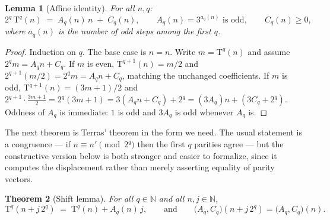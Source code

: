 \documentclass[11pt,a4paper]{article}
\theoremstyle{plain}
\newtheorem{theorem}{Theorem}[section]
\newtheorem{lemma}[theorem]{Lemma}
\theoremstyle{definition}
\newcommand{\N}{\mathbb{N}}
\newcommand{\Tmap}{\mathrm{T}}
\newcommand{\Acoef}{A}
\newcommand{\Ccoef}{C}
\begin{document}
\begin{lemma}[Affine identity]\label{lem:affine}
For all $n, q$:
\[
  2^{q}\,\Tmap^{q}(n) \;=\; \Acoef_{q}(n)\, n \;+\; \Ccoef_{q}(n),
  \qquad \Acoef_{q}(n) = 3^{a_{q}(n)} \text{ is odd},
  \qquad \Ccoef_{q}(n) \geq 0,
\]
where $a_{q}(n)$ is the number of odd steps among the first $q$.
\end{lemma}

\begin{proof}
Induction on $q$. The base case is $n = n$. Write $m = \Tmap^{q}(n)$ and assume
$2^{q}m = \Acoef_{q}n + \Ccoef_{q}$.
If $m$ is even, $\Tmap^{q+1}(n) = m/2$ and
$2^{q+1}(m/2) = 2^{q}m = \Acoef_{q}n + \Ccoef_{q}$, matching the unchanged
coefficients.
If $m$ is odd, $\Tmap^{q+1}(n) = (3m+1)/2$ and
$2^{q+1}\cdot\frac{3m+1}{2} = 2^{q}(3m+1) = 3(\Acoef_{q}n + \Ccoef_{q}) + 2^{q}
= (3\Acoef_{q})n + (3\Ccoef_{q} + 2^{q})$.
Oddness of $\Acoef_{q}$ is immediate: $1$ is odd and $3\Acoef_{q}$ is odd
whenever $\Acoef_{q}$ is.
\end{proof}

The next theorem is Terras' theorem in the form we need. The usual statement
is a congruence --- if $n \equiv n' \pmod{2^{q}}$ then the first $q$ parities
agree --- but the constructive version below is both stronger and easier to
formalize, since it computes the displacement rather than merely asserting
equality of parity vectors.

\begin{theorem}[Shift lemma]\label{thm:shift}
For all $q \in \N$ and all $n, j \in \N$,
\[
  \Tmap^{q}\!\left(n + j\,2^{q}\right) \;=\; \Tmap^{q}(n) + \Acoef_{q}(n)\, j,
  \qquad\text{and}\qquad
  \bigl(\Acoef_{q},\Ccoef_{q}\bigr)\!\left(n + j\,2^{q}\right)
    = \bigl(\Acoef_{q},\Ccoef_{q}\bigr)(n).
\]
\end{theorem}
\end{document}
